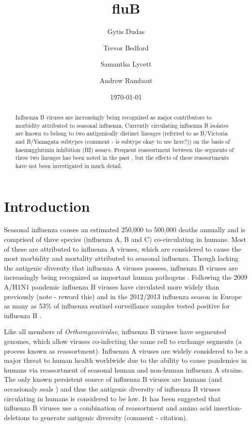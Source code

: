 \documentclass[11pt,oneside,letterpaper]{article}
\title{\vspace{1.0cm} \LARGE \bf fluB}
\author[1]{Gytis Dudas}
\author[1]{Trevor Bedford}
\author[1]{Samantha Lycett}
\author[1,2]{Andrew Rambaut}
\affil[1]{Institute of Evolutionary Biology, University of Edinburgh, Edinburgh, UK}
\affil[2]{Fogarty International Center, National Institutes of Health, Bethesda, MD, USA.}
\date{\today}
\begin{document}
\maketitle

\begin{abstract}

Influenza B viruses are increasingly being recognized as major contributors to morbidity attributed to seasonal influenza. 
Currently circulating influenza B isolates are known to belong to two antigenically distinct lineages (referred to as B/Victoria and B/Yamagata subtypes (comment - is subtype okay to use here?)) on the basis of haemagglutinin inhibition (HI) assays. 
Frequent reassortment between the segments of these two lineages has been noted in the past \cite{lindstrom1999}, but the effects of these reassortments have not been investigated in much detail.

\end{abstract}

\pagebreak


\section*{Introduction}
Seasonal influenza causes an estimated 250,000 to 500,000 deaths annually and is comprised of three species (influenza A, B and C) co-circulating in humans.
Most of these are attributed to influenza A viruses, which are considered to cause the most morbidity and mortality attributed to seasonal influenza.
Though lacking the antigenic diversity that influenza A viruses possess, influenza B viruses are increasingly being recognized as important human pathogens \cite{paul-glezen2013}.
Following the 2009 A/H1N1 pandemic influenza B viruses have circulated more widely than previously (note - reword this) and in the 2012/2013 influenza season in Europe as many as 53\% of influenza sentinel surveillance samples tested positive for influenza B \cite{ECDC1213}. 

Like all members of \textit{Orthomyxoviridae}, influenza B viruses have segmented genomes, which allow viruses co-infecting the same cell to exchange segments (a process known as reassortment). 
Influenza A viruses are widely considered to be a major threat to human health worldwide due to the ability to cause pandemics in humans via reassortment of seasonal human and non-human influenza A strains. 
The only known persistent source of influenza B viruses are humans (and occasionaly seals \cite{osterhaus2000}) and thus the antigenic diversity of influenza B viruses circulating in humans is considered to be low. 
It has been suggested that influenza B viruses use a combination of reassortment and amino acid insertion-deletions to generate antigenic diversity (comment - citation).
\end{document}
